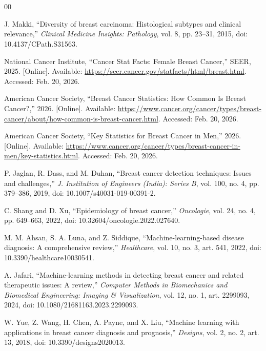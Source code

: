 \documentclass[conference]{IEEEtran}
\begin{document}
\section*{}
\begin{thebibliography}{00}

 J. Makki, ``Diversity of breast carcinoma: Histological subtypes and clinical relevance,'' \emph{Clinical Medicine Insights: Pathology}, vol. 8, pp. 23--31, 2015, doi: 10.4137/CPath.S31563.

 National Cancer Institute, ``Cancer Stat Facts: Female Breast Cancer,'' SEER, 2025. [Online]. Available: \url{https://seer.cancer.gov/statfacts/html/breast.html}. Accessed: Feb. 20, 2026.

 American Cancer Society, ``Breast Cancer Statistics: How Common Is Breast Cancer?,'' 2026. [Online]. Available: \url{https://www.cancer.org/cancer/types/breast-cancer/about/how-common-is-breast-cancer.html}. Accessed: Feb. 20, 2026.

 American Cancer Society, ``Key Statistics for Breast Cancer in Men,'' 2026. [Online]. Available: \url{https://www.cancer.org/cancer/types/breast-cancer-in-men/key-statistics.html}. Accessed: Feb. 20, 2026.

 P. Jaglan, R. Dass, and M. Duhan, ``Breast cancer detection techniques: Issues and challenges,'' \emph{J. Institution of Engineers (India): Series B}, vol. 100, no. 4, pp. 379--386, 2019, doi: 10.1007/s40031-019-00391-2.

 C. Shang and D. Xu, ``Epidemiology of breast cancer,'' \emph{Oncologie}, vol. 24, no. 4, pp. 649--663, 2022, doi: 10.32604/oncologie.2022.027640.

 M. M. Ahsan, S. A. Luna, and Z. Siddique, ``Machine-learning-based disease diagnosis: A comprehensive review,'' \emph{Healthcare}, vol. 10, no. 3, art. 541, 2022, doi: 10.3390/healthcare10030541.

 A. Jafari, ``Machine-learning methods in detecting breast cancer and related therapeutic issues: A review,'' \emph{Computer Methods in Biomechanics and Biomedical Engineering: Imaging \& Visualization}, vol. 12, no. 1, art. 2299093, 2024, doi: 10.1080/21681163.2023.2299093.

 W. Yue, Z. Wang, H. Chen, A. Payne, and X. Liu, ``Machine learning with applications in breast cancer diagnosis and prognosis,'' \emph{Designs}, vol. 2, no. 2, art. 13, 2018, doi: 10.3390/designs2020013.


\end{thebibliography}
\end{document}
